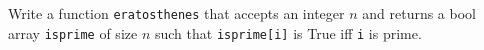   Write a function \verb!eratosthenes! that accepts an integer $n$
  and returns a bool array \verb!isprime! of size $n$ such that
  \verb!isprime[i]! is True iff \verb!i! is prime.

